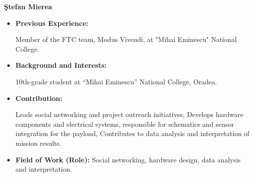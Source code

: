 \item[] \textbf{\c{S}tefan Mierea}
    \begin{itemize}[label=]
        \item[\faCogs] \textbf{Previous Experience:} 
            \begin{itemize}[label=\textbullet]
                \myitemtwo Member of the FTC team, Modus Vivendi, at "Mihai Eminescu" National College.
            \end{itemize}
        \item[\faGraduationCap] \textbf{Background and Interests:} 
            \begin{itemize}[label=\textbullet]
                \myitemtwo 10th-grade student at “Mihai Eminescu” National College, Oradea.
            \end{itemize}
        \item[\faEdit] \textbf{Contribution:}
            \begin{itemize}[label=\textbullet]
                \myitemtwo Leads social networking and project outreach initiatives,
                \myitemtwo Develops hardware components and electrical systems, responsible for schematics and sensor integration for the payload,
                \myitemtwo Contributes to data analysis and interpretation of mission results.
            \end{itemize}
        \item[\faMicroscope] \textbf{Field of Work (Role):} Social networking, hardware design, data analysis and interpretation.
    \end{itemize}
    \vspace{0.2 cm}
    